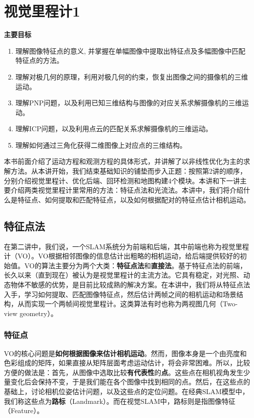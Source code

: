 \chapter{视觉里程计1}
\label{cpt:7}
\thispagestyle{empty}

\begin{mdframed}  
	\textbf{主要目标}
	\begin{enumerate}[labelindent=0em,leftmargin=1.5em]
		\item 理解图像特征点的意义, 并掌握在单幅图像中提取出特征点及多幅图像中匹配特征点的方法。
		\item 理解对极几何的原理，利用对极几何的约束，恢复出图像之间的摄像机的三维运动。
		\item 理解PNP问题，以及利用已知三维结构与图像的对应关系求解摄像机的三维运动。
		\item 理解ICP问题，以及利用点云的匹配关系求解摄像机的三维运动。
		\item 理解如何通过三角化获得二维图像上对应点的三维结构。
	\end{enumerate}
\end{mdframed}

本书前面介绍了运动方程和观测方程的具体形式，并讲解了以非线性优化为主的求解方法。从本讲开始，我们结束基础知识的铺垫而步入正题：按照第2讲的顺序，分别介绍视觉里程计、优化后端、回环检测和地图构建4个模块。本讲和下一讲主要介绍两类视觉里程计里常用的方法：特征点法和光流法。本讲中，我们将介绍什么是特征点、如何提取和匹配特征点，以及如何根据配对的特征点估计相机运动。

\newpage


\newpage

\section{特征点法}
在第二讲中，我们说，一个SLAM系统分为前端和后端，其中前端也称为视觉里程计（VO）。VO根据相邻图像的信息估计出粗略的相机运动，给后端提供较好的初始值。VO的算法主要分为两个大类：\textbf{特征点法}和\textbf{直接法}。基于特征点法的前端，长久以来（直到现在）被认为是视觉里程计的主流方法。它具有稳定，对光照、动态物体不敏感的优势，是目前比较成熟的解决方案。在本讲中，我们将从特征点法入手，学习如何提取、匹配图像特征点，然后估计两帧之间的相机运动和场景结构，从而实现一个两帧间视觉里程计。这类算法有时也称为两视图几何（Two-view geometry）。

\subsection{特征点}
VO的核心问题是\textbf{如何根据图像来估计相机运动}。然而，图像本身是一个由亮度和色彩组成的矩阵，如果直接从矩阵层面考虑运动估计，将会非常困难。所以，比较方便的做法是：首先，从图像中选取比较\textbf{有代表性}的\textbf{点}。这些点在相机视角发生少量变化后会保持不变，于是我们能在各个图像中找到相同的点。然后，在这些点的基础上，讨论相机位姿估计问题，以及这些点的定位问题。在经典SLAM模型中，我们称这些点为\textbf{路标}（Landmark）。而在视觉SLAM中，路标则是指图像特征（Feature）。

